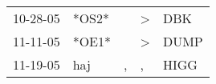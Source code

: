 \begin{supertabular}{p{0.07\textwidth}p{0.06\textwidth}p{0.02\textwidth}p{0.02\textwidth}p{0.06\textwidth}}
 10-28-05\textsuperscript{} &                  *OS2* &    &  \textgreater &   DBK\textsuperscript{} \\
 11-11-05\textsuperscript{} &                  *OE1* &    &  \textgreater &  DUMP\textsuperscript{} \\
 11-19-05\textsuperscript{} &  haj\textsuperscript{} &  , &             , &  HIGG\textsuperscript{} \\
\end{supertabular}
